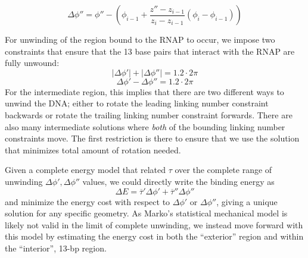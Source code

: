 \documentclass[11pt]{article} %
\begin{document}
\begin{equation}
    \Delta \phi'' = \phi'' - \left(\phi_{i - 1} + \frac{z'' - z_{i-1}}{z_i - z_{i-1}} (\phi_i - \phi_{i-1})\right)
\end{equation}

For unwinding of the region bound to the RNAP to occur, we impose two constraints that ensure that the 13 base pairs that interact with the RNAP are fully unwound:
\begin{equation}
    |\Delta \phi'| + |\Delta \phi''| = 1.2 \cdot 2 \pi
\end{equation}
\begin{equation}
    \Delta \phi' - \Delta \phi'' = 1.2 \cdot 2\pi \label{eq:dphi_relation}
\end{equation}
For the intermediate region, this implies that there are two different ways to unwind the DNA; either to rotate the leading linking number constraint backwards or rotate the trailing linking number constraint forwards. There are also many intermediate solutions where \emph{both} of the bounding linking number constraints move. The first restriction is there to ensure that we use the solution that minimizes total amount of rotation needed.

Given a complete energy model that related \(\tau\) over the complete range of unwinding \(\Delta \phi', \Delta \phi''\) values, we could directly write the binding energy as
\begin{equation}
    \Delta E = \overline \tau' \Delta \phi' + \overline \tau'' \Delta \phi''
    \label{eq:direct_torque_calc}
\end{equation}
and minimize the energy cost with respect to \(\Delta \phi'\) or \(\Delta \phi''\), giving a unique solution for any specific geometry. As Marko's statistical mechanical model is likely not valid in the limit of complete unwinding, we instead move forward with this model by estimating the energy cost in both the ``exterior'' region and within the ``interior'', 13-bp region.
\end{document}
